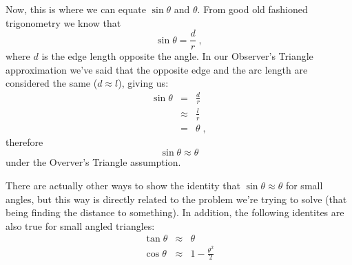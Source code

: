 \documentclass[12pt]{scrartcl}
\begin{document}
Now, this is where we can equate $\sin \theta$ and $\theta$. From good old fashioned
trigonometry we know that
\[ \sin \theta = \frac{d}{r} \;, \]
where $d$ is the edge length opposite the angle. In our Observer's Triangle approximation
we've said that the opposite edge and the arc length are considered the same ($d \approx l$),
giving us:
\begin{eqnarray*}
\sin \theta &=& \frac{d}{r} \\
&\approx& \frac{l}{r} \\
&=& \theta \; ,
\end{eqnarray*}
therefore
\[ \sin \theta \approx \theta\]
under the Overver's Triangle assumption.

There are actually other ways to show the identity that $\sin \theta \approx \theta$ for
small angles, but this way is directly related to the problem we're trying to solve
(that being finding the distance to something). In addition, the following identites
are also true for small angled triangles:
\begin{eqnarray*}
\tan \theta &\approx& \theta \\
\cos \theta &\approx& 1 - \frac{\theta^2}{2}
\end{eqnarray*}
\end{document}
